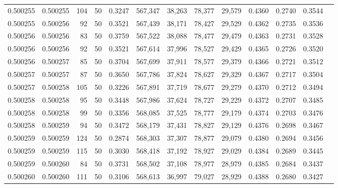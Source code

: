 \begin{tabular}{rrrrrrrrrrrrr}
0.500255 & 0.500255 &   104 &  50 &                                     0.3247 & 567,347 &  38,263 &  78,377 &  29,579 & 0.4360 & 0.2740 & 0.3544 \\
0.500255 & 0.500256 &    92 &  50 &                                     0.3521 & 567,439 &  38,171 &  78,427 &  29,529 & 0.4362 & 0.2735 & 0.3536 \\
0.500256 & 0.500256 &    83 &  50 &                                     0.3759 & 567,522 &  38,088 &  78,477 &  29,479 & 0.4363 & 0.2731 & 0.3528 \\
0.500256 & 0.500256 &    92 &  50 &                                     0.3521 & 567,614 &  37,996 &  78,527 &  29,429 & 0.4365 & 0.2726 & 0.3520 \\
0.500256 & 0.500257 &    85 &  50 &                                     0.3704 & 567,699 &  37,911 &  78,577 &  29,379 & 0.4366 & 0.2721 & 0.3512 \\
0.500257 & 0.500257 &    87 &  50 &                                     0.3650 & 567,786 &  37,824 &  78,627 &  29,329 & 0.4367 & 0.2717 & 0.3504 \\
0.500257 & 0.500258 &   105 &  50 &                                     0.3226 & 567,891 &  37,719 &  78,677 &  29,279 & 0.4370 & 0.2712 & 0.3494 \\
0.500258 & 0.500258 &    95 &  50 &                                     0.3448 & 567,986 &  37,624 &  78,727 &  29,229 & 0.4372 & 0.2707 & 0.3485 \\
0.500258 & 0.500258 &    99 &  50 &                                     0.3356 & 568,085 &  37,525 &  78,777 &  29,179 & 0.4374 & 0.2703 & 0.3476 \\
0.500258 & 0.500259 &    94 &  50 &                                     0.3472 & 568,179 &  37,431 &  78,827 &  29,129 & 0.4376 & 0.2698 & 0.3467 \\
0.500259 & 0.500259 &   124 &  50 &                                     0.2874 & 568,303 &  37,307 &  78,877 &  29,079 & 0.4380 & 0.2694 & 0.3456 \\
0.500259 & 0.500259 &   115 &  50 &                                     0.3030 & 568,418 &  37,192 &  78,927 &  29,029 & 0.4384 & 0.2689 & 0.3445 \\
0.500259 & 0.500260 &    84 &  50 &                                     0.3731 & 568,502 &  37,108 &  78,977 &  28,979 & 0.4385 & 0.2684 & 0.3437 \\
0.500260 & 0.500260 &   111 &  50 &                                     0.3106 & 568,613 &  36,997 &  79,027 &  28,929 & 0.4388 & 0.2680 & 0.3427 \\

\end{tabular}
